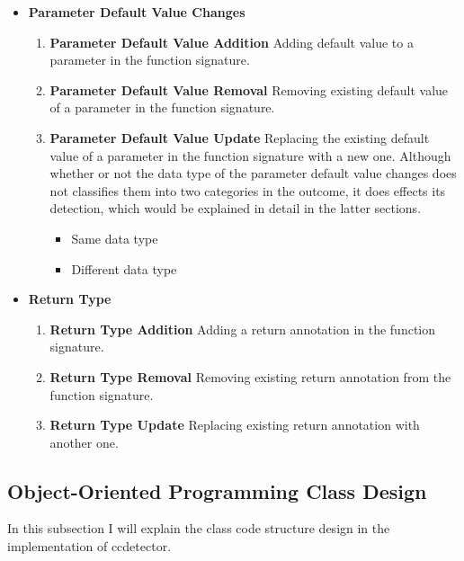 \begin{itemize}
	\item \textbf{Parameter Default Value Changes}
	\begin{enumerate}
		\item \textbf{Parameter Default Value Addition} Adding default value to a parameter in the function signature.
		\item \textbf{Parameter Default Value Removal} Removing existing default value of a parameter in the function signature.
		\item \textbf{Parameter Default Value Update} Replacing the existing default value of a parameter in the function signature with a new one. Although whether or not the data type of the parameter default value changes does not classifies them into two categories in the outcome, it does effects its detection, which would be explained in detail in the latter sections.
		\begin{itemize}
			\item Same data type
			\item Different data type
		\end{itemize}
	\end{enumerate}

	\item \textbf{Return Type}
	\begin{enumerate}
		\item \textbf{Return Type Addition} Adding a return annotation in the function signature.
		\item \textbf{Return Type Removal} Removing existing return annotation from the function signature.
		\item \textbf{Return Type Update} Replacing existing return annotation with another one.
	\end{enumerate}
\end{itemize}

\subsection{Object-Oriented Programming Class Design}

In this subsection I will explain the class code structure design in the implementation of ccdetector.

\newpage

